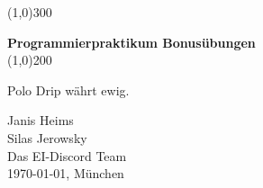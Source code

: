 \begin{titlepage}
	\vspace*{\fill}
	\begin{center}
		\color{gray}\line(1,0){300} \\
		\color{black}
		\vspace{1cm}

		\huge{\bfseries Programmierpraktikum Bonusübungen} \\
		[0.15in]
		\color{gray}\line(1,0){200} \\
		\color{black}

		\vspace{0.5cm}
		\begin{minipage}{8cm}
			\begin{center}
				\large{Polo Drip währt ewig.}
			\end{center}
		\end{minipage}	
	\end{center}
	\vspace*{\fill}
	\vspace{3cm}
	
	\begin{flushright}
		Janis Heims \\
        Silas Jerowsky \\
        Das EI-Discord Team \\
        \today, München
	\end{flushright}
\end{titlepage}

